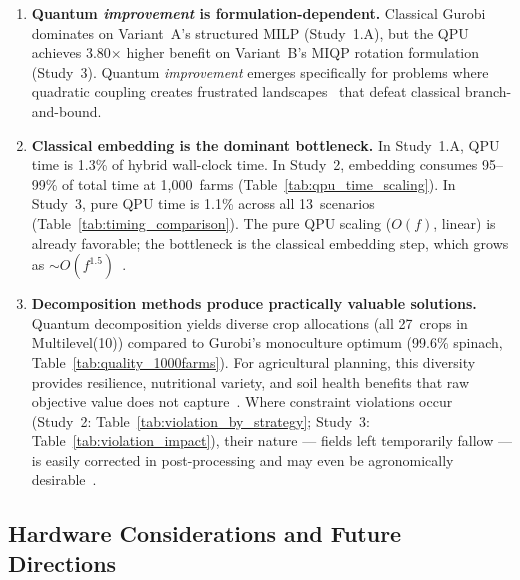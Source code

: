 \begin{enumerate}
    \item \textbf{Quantum \textit{improvement} is formulation-dependent.} Classical Gurobi dominates on Variant~A's structured MILP (Study~1.A), but the QPU achieves 3.80$\times$ higher benefit on Variant~B's MIQP rotation formulation (Study~3). Quantum \textit{improvement} emerges specifically for problems where quadratic coupling creates frustrated landscapes~\cite{barahona1982computational, lucasIsingFormulationsMany2014} that defeat classical branch-and-bound.

    \item \textbf{Classical embedding is the dominant bottleneck.} In Study~1.A, QPU time is 1.3\% of hybrid wall-clock time. In Study~2, embedding consumes 95--99\% of total time at 1,000~farms (Table~\ref{tab:qpu_time_scaling}). In Study~3, pure QPU time is 1.1\% across all 13~scenarios (Table~\ref{tab:timing_comparison}). The pure QPU scaling ($O(f)$, linear) is already favorable; the bottleneck is the classical embedding step, which grows as $\sim O(f^{1.5})$~\cite{zbinden2020embedding}.

    \item \textbf{Decomposition methods produce practically valuable solutions.} Quantum decomposition yields diverse crop allocations (all 27~crops in Multilevel(10)) compared to Gurobi's monoculture optimum (99.6\% spinach, Table~\ref{tab:quality_1000farms}). For agricultural planning, this diversity provides resilience, nutritional variety, and soil health benefits that raw objective value does not capture~\cite{lin2011resilience, bowles2020longterm}. Where constraint violations occur (Study~2: Table~\ref{tab:violation_by_strategy}; Study~3: Table~\ref{tab:violation_impact}), their nature --- fields left temporarily fallow --- is easily corrected in post-processing and may even be agronomically desirable~\cite{dury2012cropping, hobbs2008conservation}.
\end{enumerate}


\subsection{Hardware Considerations and Future Directions}
\label{subsec:hardware_future}

